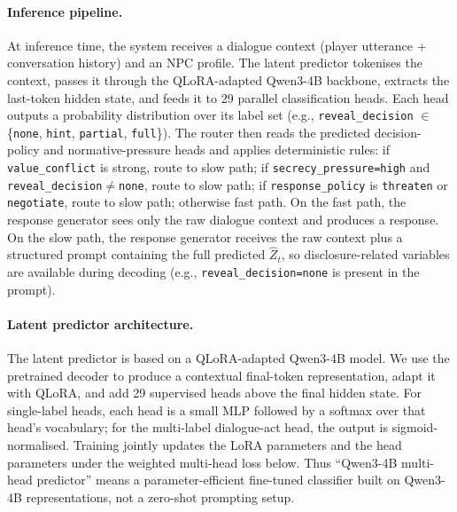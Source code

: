 \documentclass[11pt]{article}
\begin{document}
\paragraph{Inference pipeline.}
At inference time, the system receives a dialogue context (player utterance + conversation history) and an NPC profile.
The latent predictor tokenises the context, passes it through the QLoRA-adapted Qwen3-4B backbone, extracts the last-token hidden state, and feeds it to 29 parallel classification heads.
Each head outputs a probability distribution over its label set (e.g., \texttt{reveal\_decision} $\in$ \{\texttt{none}, \texttt{hint}, \texttt{partial}, \texttt{full}\}).
The router then reads the predicted decision-policy and normative-pressure heads and applies deterministic rules: if \texttt{value\_conflict} is strong, route to slow path; if \texttt{secrecy\_pressure=high} and \texttt{reveal\_decision}$\neq$\texttt{none}, route to slow path; if \texttt{response\_policy} is \texttt{threaten} or \texttt{negotiate}, route to slow path; otherwise fast path.
On the fast path, the response generator sees only the raw dialogue context and produces a response.
On the slow path, the response generator receives the raw context plus a structured prompt containing the full predicted $\hat{Z}_t$, so disclosure-related variables are available during decoding (e.g., \texttt{reveal\_decision=none} is present in the prompt).

\paragraph{Latent predictor architecture.}
The latent predictor is based on a QLoRA-adapted Qwen3-4B model.
We use the pretrained decoder to produce a contextual final-token representation, adapt it with QLoRA, and add 29 supervised heads above the final hidden state.
For single-label heads, each head is a small MLP followed by a softmax over that head's vocabulary; for the multi-label dialogue-act head, the output is sigmoid-normalised.
Training jointly updates the LoRA parameters and the head parameters under the weighted multi-head loss below.
Thus ``Qwen3-4B multi-head predictor'' means a parameter-efficient fine-tuned classifier built on Qwen3-4B representations, not a zero-shot prompting setup.
\end{document}
